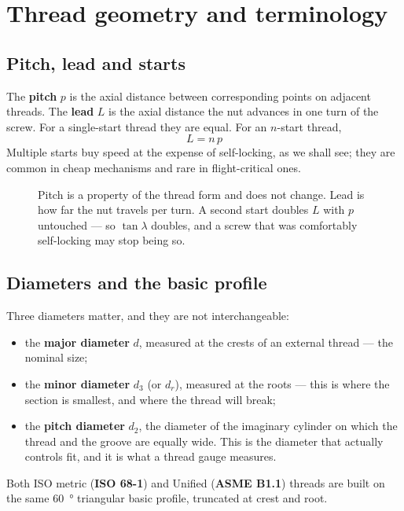 \documentclass[11pt,a4paper]{article}
\begin{document}
\section{Thread geometry and terminology}

\subsection{Pitch, lead and starts}

The \textbf{pitch} $p$ is the axial distance between corresponding points on adjacent threads. The
\textbf{lead} $L$ is the axial distance the nut advances in one turn of the screw. For a single-start
thread they are equal. For an $n$-start thread,
\[
\boxed{\,L = n\,p\,}
\]
Multiple starts buy speed at the expense of self-locking, as we shall see; they are common in cheap
mechanisms and rare in flight-critical ones.

\begin{figure}[H]\centering
\resizebox{0.56\textwidth}{!}{}
\caption{Pitch is a property of the thread form and does not change. Lead is how far the nut travels
per turn. A second start doubles $L$ with $p$ untouched --- so $\tan\lambda$ doubles, and a screw that
was comfortably self-locking may stop being so.}
\end{figure}

\subsection{Diameters and the basic profile}

Three diameters matter, and they are not interchangeable:
\begin{itemize}[nosep]
  \item the \textbf{major diameter} $d$, measured at the crests of an external thread --- the nominal size;
  \item the \textbf{minor diameter} $d_3$ (or $d_r$), measured at the roots --- this is where the section is smallest, and where the thread will break;
  \item the \textbf{pitch diameter} $d_2$, the diameter of the imaginary cylinder on which the thread and the groove are equally wide. This is the diameter that actually controls fit, and it is what a thread gauge measures.
\end{itemize}

Both ISO metric (\textbf{ISO 68-1}) and Unified (\textbf{ASME B1.1}) threads are built on the same
\SI{60}{\degree} triangular basic profile, truncated at crest and root.
\end{document}
